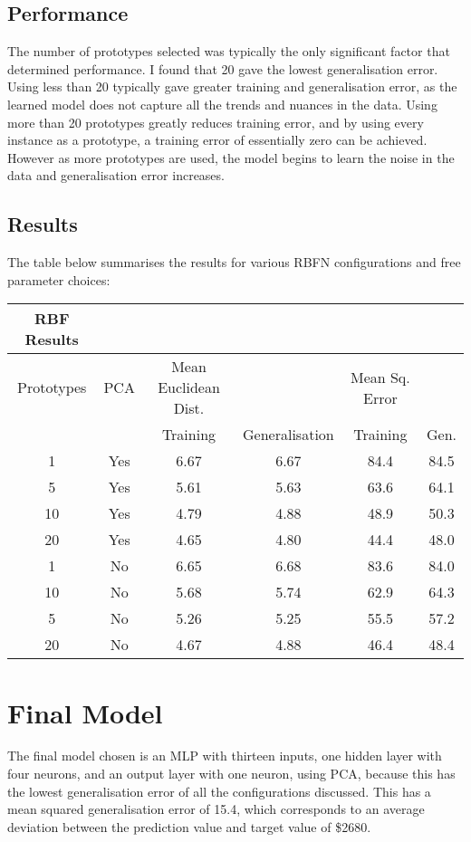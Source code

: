 \documentclass{article}
\begin{document}
\subsection*{Performance}
The number of prototypes selected was typically the only significant factor that determined performance. I found that 20 gave the lowest generalisation error. Using less than 20 typically gave greater training and generalisation error, as the learned model does not capture all the trends and nuances in the data. Using more than 20 prototypes greatly reduces training error, and by using every instance as a prototype, a training error of essentially zero can be achieved. However as more prototypes are used, the model begins to learn the noise in the data and generalisation error increases.
\subsection*{Results}
\noindent The table below summarises the results for various RBFN configurations and free parameter choices:

\begin{tabular}{c | c | c | c | c | c}
    RBF Results & & & & & \\
    \hline
    Prototypes & PCA & Mean Euclidean Dist. & & Mean Sq. Error & \\
    \hline
    & & Training & Generalisation & Training & Gen. \\
    \hline
    1 & Yes & 6.67 & 6.67 & 84.4 & 84.5 \\
    5 & Yes & 5.61 & 5.63 & 63.6 & 64.1 \\
    10 & Yes & 4.79 & 4.88 & 48.9 & 50.3 \\
    20 & Yes & 4.65 & 4.80 & 44.4 & 48.0 \\
    1 & No & 6.65 & 6.68 & 83.6 & 84.0 \\
    10 & No & 5.68 & 5.74 & 62.9 & 64.3 \\
    5 & No & 5.26 & 5.25 & 55.5 & 57.2 \\
    20 & No & 4.67 & 4.88 & 46.4 & 48.4 \\
\end{tabular}

\section*{Final Model}
The final model chosen is an MLP with thirteen inputs, one hidden layer with four neurons, and an output layer with one neuron, using PCA, because this has the lowest generalisation error of all the configurations discussed. This has a mean squared generalisation error of 15.4, which corresponds to an average deviation between the  prediction value and target value of \$2680.
\end{document}
